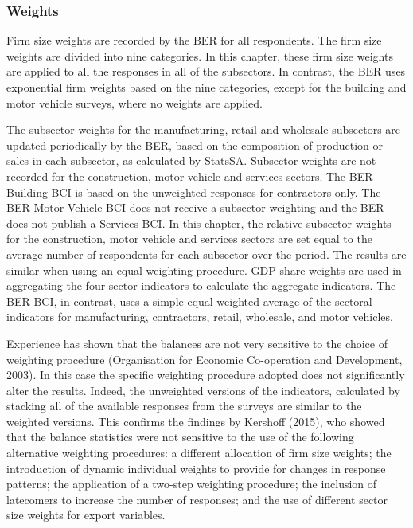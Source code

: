 \documentclass[11pt,]{article}
\begin{document}
\subsubsection{Weights}\label{weights}

Firm size weights are recorded by the BER for all respondents. The firm
size weights are divided into nine categories. In this chapter, these
firm size weights are applied to all the responses in all of the
subsectors. In contrast, the BER uses exponential firm weights based on
the nine categories, except for the building and motor vehicle surveys,
where no weights are applied.

The subsector weights for the manufacturing, retail and wholesale
subsectors are updated periodically by the BER, based on the composition
of production or sales in each subsector, as calculated by StatsSA.
Subsector weights are not recorded for the construction, motor vehicle
and services sectors. The BER Building BCI is based on the unweighted
responses for contractors only. The BER Motor Vehicle BCI does not
receive a subsector weighting and the BER does not publish a Services
BCI. In this chapter, the relative subsector weights for the
construction, motor vehicle and services sectors are set equal to the
average number of respondents for each subsector over the period. The
results are similar when using an equal weighting procedure. GDP share
weights are used in aggregating the four sector indicators to calculate
the aggregate indicators. The BER BCI, in contrast, uses a simple equal
weighted average of the sectoral indicators for manufacturing,
contractors, retail, wholesale, and motor vehicles.

Experience has shown that the balances are not very sensitive to the
choice of weighting procedure (Organisation for Economic Co-operation
and Development, 2003). In this case the specific weighting procedure
adopted does not significantly alter the results. Indeed, the unweighted
versions of the indicators, calculated by stacking all of the available
responses from the surveys are similar to the weighted versions. This
confirms the findings by Kershoff (2015), who showed that the balance
statistics were not sensitive to the use of the following alternative
weighting procedures: a different allocation of firm size weights; the
introduction of dynamic individual weights to provide for changes in
response patterns; the application of a two-step weighting procedure;
the inclusion of latecomers to increase the number of responses; and the
use of different sector size weights for export variables.
\end{document}
